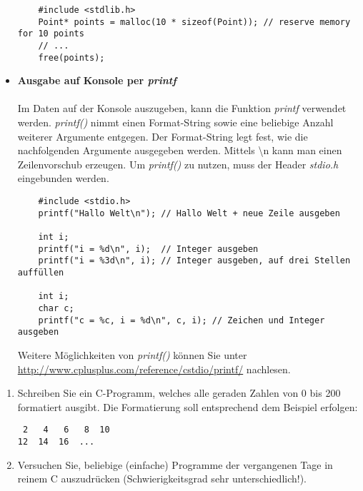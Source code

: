 \documentclass[
  accentcolor=tud1c,	%
  colorbacktitle,		%
  inverttitle,			%
  german,				%
  twoside
]{tudexercise}
\begin{document}
\begin{itemize}
\begin{lstlisting}
	#include <stdlib.h>
	Point* points = malloc(10 * sizeof(Point)); // reserve memory for 10 points
	// ...
	free(points);
\end{lstlisting} 

\item[] \textbf{Ausgabe auf Konsole per \emph{printf}}\\\\
Im Daten auf der Konsole auszugeben, kann die Funktion \emph{printf} verwendet werden. \emph{printf()} nimmt einen Format-String sowie eine beliebige Anzahl weiterer Argumente entgegen. Der Format-String legt fest, wie die nachfolgenden Argumente ausgegeben werden.
Mittels \textbackslash n kann man einen Zeilenvorschub erzeugen. Um \emph{printf()} zu nutzen, muss der Header \emph{stdio.h} eingebunden werden. 

\begin{lstlisting}
	#include <stdio.h>
	printf("Hallo Welt\n"); // Hallo Welt + neue Zeile ausgeben
	
	int i;
	printf("i = %d\n", i);  // Integer ausgeben
	printf("i = %3d\n", i); // Integer ausgeben, auf drei Stellen auffüllen
	
	int i;
	char c;
	printf("c = %c, i = %d\n", c, i); // Zeichen und Integer ausgeben
\end{lstlisting} 

Weitere Möglichkeiten von \emph{printf()} können Sie unter \url{http://www.cplusplus.com/reference/cstdio/printf/} nachlesen.

\end{itemize}

\begin{enumerate}
\item Schreiben Sie ein C-Programm, welches alle geraden Zahlen von 0 bis 200 formatiert ausgibt. Die Formatierung soll entsprechend dem Beispiel erfolgen:
\begin{lstlisting}
 2   4   6   8  10
12  14  16  ...
\end{lstlisting}

\item Versuchen Sie, beliebige (einfache) Programme der vergangenen Tage in reinem C auszudrücken (Schwierigkeitsgrad sehr unterschiedlich!).
\end{enumerate}
\end{document}
